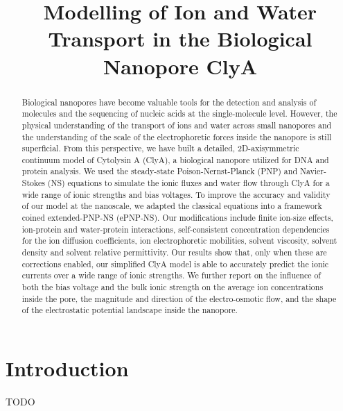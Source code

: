 \documentclass[journal=ancac3, manuscript=article, etalmode=truncate,maxauthors=0]{achemso}
\title{Modelling of Ion and Water Transport in the Biological Nanopore ClyA}
\begin{document}
\maketitle
\newpage
\begin{abstract}
Biological nanopores have become valuable tools for the detection and analysis of molecules and the sequencing of nucleic acids at the single-molecule level. However, the physical understanding of the transport of ions and water across small nanopores and the understanding of the scale of the electrophoretic forces inside the nanopore is still superficial. From this perspective, we have built a detailed, 2D-axisymmetric continuum model of Cytolysin A (ClyA), a biological nanopore utilized for DNA and protein analysis. We used the steady-state Poison-Nernst-Planck (PNP) and Navier-Stokes (NS) equations to simulate the ionic fluxes and water flow through ClyA for a wide range of ionic strengths and bias voltages. To improve the accuracy and validity of our model at the nanoscale, we adapted the classical equations into a framework coined extended-PNP-NS (ePNP-NS). Our modifications include finite ion-size effects, ion-protein and water-protein interactions, self-consistent concentration dependencies for the ion diffusion coefficients, ion electrophoretic mobilities, solvent viscosity, solvent density and solvent relative permittivity. Our results show that, only when these are corrections enabled, our simplified ClyA model is able to accurately predict the ionic currents over a wide range of ionic strengths. We further report on the influence of both the bias voltage and the bulk ionic strength on the average ion concentrations inside the pore, the magnitude and direction of the electro-osmotic flow, and the shape of the electrostatic potential landscape inside the nanopore.
\end{abstract}
\newpage
\section{Introduction}


TODO
\end{document}
